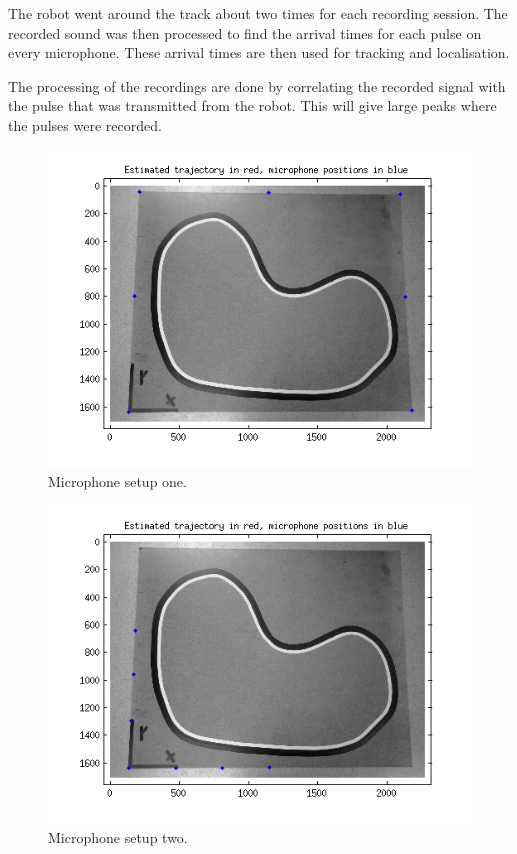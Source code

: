 \documentclass[10pt,a4paper]{report}
\begin{document}
The robot went around the track about two times for each recording session.
The recorded sound was then processed to find the arrival times for each pulse on every microphone.
These arrival times are then used for tracking and localisation.

The processing of the recordings are done by correlating the recorded signal with the pulse that was transmitted from the robot.
This will give large peaks where the pulses were recorded.

\begin{figure}[!h]
  \includegraphics[scale=0.9]{microphone_pos_good.png}
  \caption{Microphone setup one.}
  \label{good_setup}
\end{figure}

\begin{figure}[!h]
  \includegraphics[scale=0.9]{microphone_pos_bad.png}
  \caption{Microphone setup two.}
  \label{bad_setup}
\end{figure}
\end{document}
